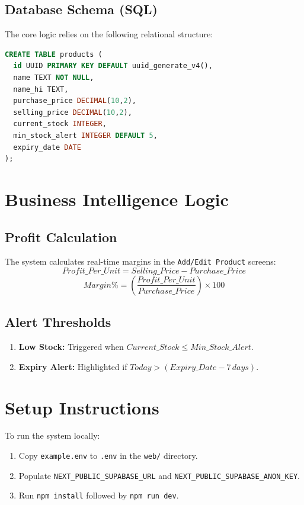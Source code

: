 \documentclass[a4paper,11pt]{article}
\begin{document}
\subsection{Database Schema (SQL)}
The core logic relies on the following relational structure:
\begin{lstlisting}[language=SQL]
CREATE TABLE products (
  id UUID PRIMARY KEY DEFAULT uuid_generate_v4(),
  name TEXT NOT NULL,
  name_hi TEXT,
  purchase_price DECIMAL(10,2),
  selling_price DECIMAL(10,2),
  current_stock INTEGER,
  min_stock_alert INTEGER DEFAULT 5,
  expiry_date DATE
);
\end{lstlisting}

\section{Business Intelligence Logic}

\subsection{Profit Calculation}
The system calculates real-time margins in the \texttt{Add/Edit Product} screens:
\begin{equation}
Profit\_Per\_Unit = Selling\_Price - Purchase\_Price
\end{equation}
\begin{equation}
Margin\% = \left( \frac{Profit\_Per\_Unit}{Purchase\_Price} \right) \times 100
\end{equation}

\subsection{Alert Thresholds}
\begin{enumerate}
    \item \textbf{Low Stock:} Triggered when $Current\_Stock \leq Min\_Stock\_Alert$.
    \item \textbf{Expiry Alert:} Highlighted if $Today > (Expiry\_Date - 7\,days)$.
\end{enumerate}

\section{Setup Instructions}
To run the system locally:
\begin{enumerate}
    \item Copy \texttt{example.env} to \texttt{.env} in the \texttt{web/} directory.
    \item Populate \texttt{NEXT_PUBLIC_SUPABASE_URL} and \texttt{NEXT_PUBLIC_SUPABASE_ANON_KEY}.
    \item Run \texttt{npm install} followed by \texttt{npm run dev}.
\end{enumerate}
\end{document}
